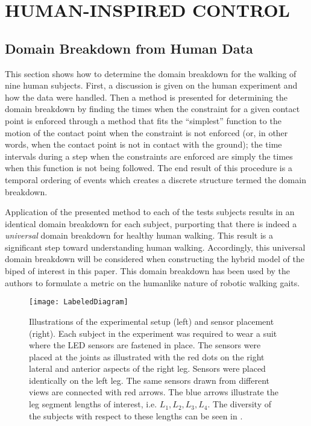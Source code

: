 \chapter{\uppercase{Human-Inspired Control}} \label{ch:hic}

\section{Domain Breakdown from Human Data} \label{sec:domainbreakdown} \noindent
This section shows how to determine the domain breakdown for the walking of nine human subjects.  First, a discussion is given on the human experiment and how the data were handled. Then a method is presented for determining the domain breakdown by finding the times when the constraint for a given contact point is enforced through a method that fits the ``simplest'' function to the motion of the contact point when the constraint is not enforced (or, in other words, when the contact point is not in contact with the ground); the time intervals during a step when the constraints are enforced are simply the times when this function is not being followed. The end result of this procedure is a temporal ordering of events which creates a discrete structure termed the domain breakdown.

Application of the presented method to each of the tests subjects results in an identical domain breakdown for each subject, purporting that there is indeed a {\em universal} domain breakdown for healthy human walking. This result is a significant step toward understanding human walking. Accordingly, this universal domain breakdown will be considered when constructing the hybrid model of the biped of interest in this paper. This domain breakdown has been used by the authors to formulate a metric on the humanlike nature of robotic walking gaits.\cite{AVB11,VAB11}

\begin{figure}[t!]
  \centering
  \texttt{[image: LabeledDiagram]}
  \caption{Illustrations of the experimental setup (left) and sensor placement (right). Each subject in the experiment was required to wear a suit where the LED sensors are fastened in place. The sensors were placed at the joints as illustrated with the red dots on the right lateral and anterior aspects of the right leg. Sensors were placed identically on the left leg. The same sensors drawn from different views are connected with red arrows. The blue arrows illustrate the leg segment lengths of interest, i.e. $L_1, L_2, L_3, L_4$. The diversity of the subjects with respect to these lengths can be seen in .}
  \label{fig:Sensors}
\end{figure}

